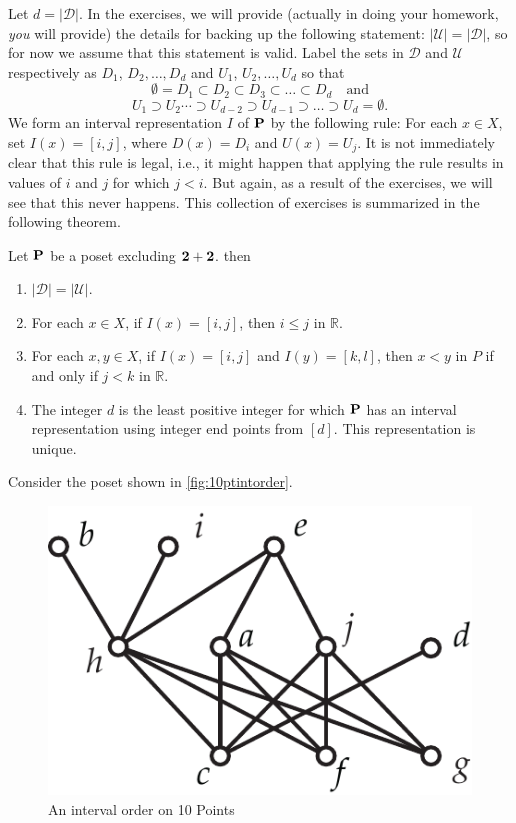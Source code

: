 Let $d=|\mathcal{D}|$.  In the exercises, we will provide
(actually in doing your homework, \textit{you} will provide) the details
for backing up the following statement:
$|\mathcal{U}|=|\mathcal{D}|$, so for now we assume that this
statement is valid.
Label the sets in $\mathcal{D}$ and $\mathcal{U}$ respectively as
$D_1$, $D_2,\dots,D_d$ and $U_1$, $U_2,\dots,U_d$ 
so that
\[
\emptyset= D_1\subset D_2\subset D_3\subset\dots\subset D_d
 \quad\text{and}
\]
\[
U_1\supset U_{2}\cdots \supset U_{d-2}\supset U_{d-1}\supset\dots\supset U_d
 =\emptyset.
\]
We form an interval representation $I$ of $\mathbf{P}$ by the
following rule:  For each $x\in X$, set $I(x)=[i,j]$, where
$D(x)=D_i$ and $U(x)=U_j$.  It is not immediately clear that this
rule is legal, i.e., it might happen that applying the rule results
in values of $i$ and $j$ for which $j<i$.  But again, as a result of
the exercises, we will see that this never happens. This collection
of exercises is summarized in the following theorem.

\begin{theorem}\label{thm:intord-minrep}
Let $\mathbf{P}$ be a poset excluding $\mathbf{2}+\mathbf{2}$.
then 
\begin{enumerate}
\item $|\mathcal{D}|=|\mathcal{U}|$.
\item For each $x\in X$, if $I(x)=[i,j]$, then $i\le j$ in $\mathbb{R}$.
\item For each $x,y\in X$, if $I(x)=[i,j]$ and $I(y)=[k,l]$, then
$x<y$ in $P$ if and only if $j<k$ in $\mathbb{R}$.
\item The integer $d$ is the least positive integer for which
$\mathbf{P}$ has an interval representation using integer end points
from $[d]$.  This representation is unique.
\end{enumerate}
\end{theorem}

Consider the poset shown in \autoref{fig:10ptintorder}.

\begin{figure}
\begin{center}
\includegraphics*[scale=.4]{posets-figs/10ptintorder.pdf}
\caption{An interval order on 10 Points}
\label{fig:10ptintorder} 
\end{center}
\end{figure}

